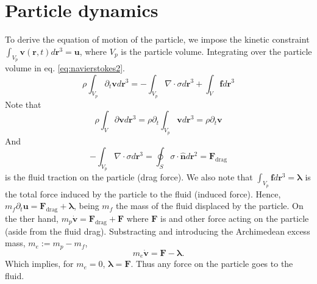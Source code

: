\documentclass[ twoside,openright,titlepage,numbers=noenddot,%
headinclude,footinclude,cleardoublepage=empty,abstract=on,
BCOR=5mm,paper=a4,fontsize=11pt, dvipsnames
]{scrreprt}
\renewcommand{\vec}[1]{\bm{#1}}
\newcommand{\tens}[1]{\bm{\mathcal{#1}}}
\newcommand{\pvel}{u}
\newcommand{\fpos}{r}
\newcommand{\fvel}{v}
\begin{document}
\section*{Particle dynamics}
To derive the equation of motion of the particle, we impose the kinetic constraint $\int_{V_p}\vec{\fvel}(\vec{\fpos}, t)d\vec{\fpos}^3 = \vec{u}$, where $V_p$ is the particle volume. Integrating over the particle volume in eq. \eqref{eq:navierstokes2}.
\begin{equation}
  \rho\int_{V_p}\partial_t\vec{\fvel}d\vec{\fpos}^3 = -\int_{V_p}\nabla\cdot\tens{\sigma}d\vec{r}^3 + \int_V\vec{f}d\vec{\fpos}^3
\end{equation}
Note that
$$\rho\int_V\partial\vec{\fvel}d\vec{\fpos}^3 = \rho \partial_t\int_{V_p}\vec{\fvel}d\vec{\fpos}^3 = \rho\partial_t\vec{\fvel}$$
And
$$
-\int_{V_p}\nabla\cdot\tens{\sigma}d\vec{\fpos}^3 = \oint_S\tens{\sigma}\cdot\hat{\vec{n}}d\vec{r}^2 = \vec{F}_{\text{drag}}
$$
is the fluid traction on the particle (drag force).
We also note that $\int_{V_p}\vec{f}d\vec{\fpos}^3 = \vec{\lambda}$ is the total force induced by the particle to the fluid (induced force\cite{Mazur1974}).
Hence, $m_f\partial_t\vec{\pvel} = \vec{F}_{\text{drag}} + \vec{\lambda}$, being $m_f$ the mass of the fluid displaced by the particle.
On the ther hand, $m_p\dot{\vec{\fvel}} = \vec{F}_{\text{drag}} + \vec{F}$ where $\vec{F}$ is and other force acting on the particle (aside from the fluid drag). Substracting and introducing the Archimedean excess mass,  $m_e := m_p - m_f$,
\begin{equation}
  m_e\dot{\vec{\fvel}} = \vec{F} - \vec{\lambda}.
\end{equation}
Which implies, for $m_e = 0$, $\vec{\lambda}=\vec{F}$. Thus any force on the particle goes to the fluid.
\end{document}
